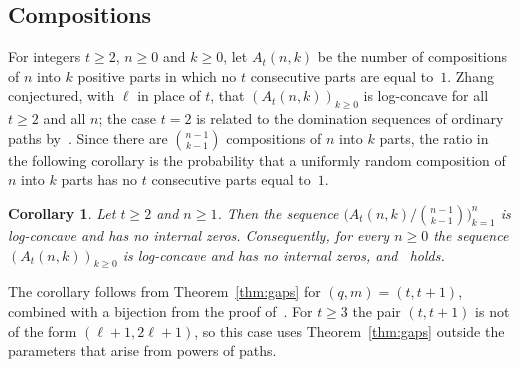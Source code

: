 \documentclass{amsart}
\newtheorem{corollary}[theorem]{Corollary}
\theoremstyle{definition}
\theoremstyle{remark}
\numberwithin{equation}{section}
\begin{document}
\subsection*{Compositions}
For integers $t\ge2$, $n\ge0$ and $k\ge0$, let $A_t(n,k)$ be the number of compositions of $n$ into $k$ positive parts in which no $t$ consecutive parts are equal to~$1$. Zhang~\cite[Conjecture~5.1.7]{Z} conjectured, with $\ell$ in place of $t$, that $(A_t(n,k))_{k\ge0}$ is log-concave for all $t\ge2$ and all $n$; the case $t=2$ is related to the domination sequences of ordinary paths by~\cite[Theorem~5.1.5]{Z}. Since there are $\binom{n-1}{k-1}$ compositions of $n$ into $k$ parts, the ratio in the following corollary is the probability that a uniformly random composition of $n$ into $k$ parts has no $t$ consecutive parts equal to~$1$.

\begin{corollary}\label{cor:comp}
Let $t\ge2$ and $n\ge1$. Then the sequence $\bigl(A_t(n,k)/\binom{n-1}{k-1}\bigr)_{k=1}^{n}$ is log-concave and has no internal zeros. Consequently, for every $n\ge0$ the sequence $(A_t(n,k))_{k\ge0}$ is log-concave and has no internal zeros, and~\cite[Conjecture~5.1.7]{Z} holds.
\end{corollary}

The corollary follows from Theorem~\ref{thm:gaps} for $(q,m)=(t,t+1)$, combined with a bijection from the proof of~\cite[Theorem~5.1.8]{Z}. For $t\ge3$ the pair $(t,t+1)$ is not of the form $(\ell+1,2\ell+1)$, so this case uses Theorem~\ref{thm:gaps} outside the parameters that arise from powers of paths.
\end{document}
